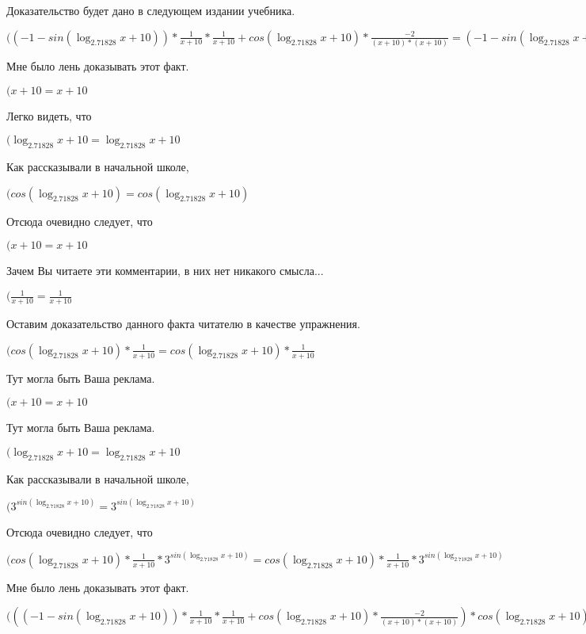 \documentclass[12pt,a4paper,fleqn]{article}
\theoremstyle{definition}
\begin{document}
Доказательство будет дано в следующем издании учебника.

$(( -1  - sin(\log_{ 2.71828 }{ x  +  10 })) * \frac{ 1 }{ x  +  10 }
 * \frac{ 1 }{ x  +  10 }
 + cos(\log_{ 2.71828 }{ x  +  10 }) * \frac{ -2 }{( x  +  10 ) * ( x  +  10 )}
 = ( -1  - sin(\log_{ 2.71828 }{ x  +  10 })) * \frac{ 1 }{ x  +  10 }
 * \frac{ 1 }{ x  +  10 }
 + cos(\log_{ 2.71828 }{ x  +  10 }) * \frac{ -2 }{( x  +  10 ) * ( x  +  10 )}
$

Мне было лень доказывать этот факт.

$( x  +  10  =  x  +  10 $

Легко видеть, что

$(\log_{ 2.71828 }{ x  +  10 } = \log_{ 2.71828 }{ x  +  10 }$

Как рассказывали в начальной школе,

$(cos(\log_{ 2.71828 }{ x  +  10 }) = cos(\log_{ 2.71828 }{ x  +  10 })$

Отсюда очевидно следует, что

$( x  +  10  =  x  +  10 $

Зачем Вы читаете эти комментарии, в них нет никакого смысла...

$(\frac{ 1 }{ x  +  10 }
 = \frac{ 1 }{ x  +  10 }
$

Оставим доказательство данного факта читателю в качестве упражнения.

$(cos(\log_{ 2.71828 }{ x  +  10 }) * \frac{ 1 }{ x  +  10 }
 = cos(\log_{ 2.71828 }{ x  +  10 }) * \frac{ 1 }{ x  +  10 }
$

Тут могла быть Ваша реклама.

$( x  +  10  =  x  +  10 $

Тут могла быть Ваша реклама.

$(\log_{ 2.71828 }{ x  +  10 } = \log_{ 2.71828 }{ x  +  10 }$

Как рассказывали в начальной школе,

$({ 3 }^{sin(\log_{ 2.71828 }{ x  +  10 })} = { 3 }^{sin(\log_{ 2.71828 }{ x  +  10 })}$

Отсюда очевидно следует, что

$(cos(\log_{ 2.71828 }{ x  +  10 }) * \frac{ 1 }{ x  +  10 }
 * { 3 }^{sin(\log_{ 2.71828 }{ x  +  10 })} = cos(\log_{ 2.71828 }{ x  +  10 }) * \frac{ 1 }{ x  +  10 }
 * { 3 }^{sin(\log_{ 2.71828 }{ x  +  10 })}$

Мне было лень доказывать этот факт.

$((( -1  - sin(\log_{ 2.71828 }{ x  +  10 })) * \frac{ 1 }{ x  +  10 }
 * \frac{ 1 }{ x  +  10 }
 + cos(\log_{ 2.71828 }{ x  +  10 }) * \frac{ -2 }{( x  +  10 ) * ( x  +  10 )}
) * cos(\log_{ 2.71828 }{ x  +  10 }) * \frac{ 1 }{ x  +  10 }
 * { 3 }^{sin(\log_{ 2.71828 }{ x  +  10 })} = (( -1  - sin(\log_{ 2.71828 }{ x  +  10 })) * \frac{ 1 }{ x  +  10 }
 * \frac{ 1 }{ x  +  10 }
 + cos(\log_{ 2.71828 }{ x  +  10 }) * \frac{ -2 }{( x  +  10 ) * ( x  +  10 )}
) * cos(\log_{ 2.71828 }{ x  +  10 }) * \frac{ 1 }{ x  +  10 }
 * { 3 }^{sin(\log_{ 2.71828 }{ x  +  10 })}$
\end{document}

